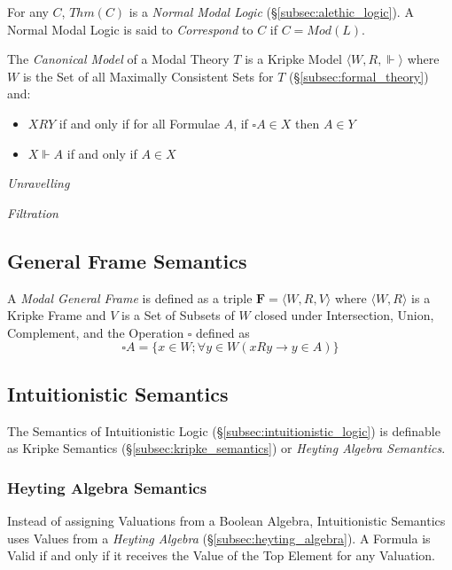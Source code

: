 For any $C$, $Thm(C)$ is a \emph{Normal Modal Logic}
(\S\ref{subsec:alethic_logic}). A Normal Modal Logic is said to
\emph{Correspond} to $C$ if $C = Mod(L)$.

The \emph{Canonical Model} of a Modal Theory $T$ is a Kripke Model
$\langle W,R, \Vdash \rangle$ where $W$ is the Set of all Maximally
Consistent Sets for $T$ (\S\ref{subsec:formal_theory}) and:
\begin{itemize}
\item $XRY$ if and only if for all Formulae $A$, if $\square A
  \in X$ then $A \in Y$
\item $X\Vdash A$ if and only if $A \in X$
\end{itemize}


\emph{Unravelling}

\emph{Filtration}

\subsection{General Frame Semantics}

A \emph{Modal General Frame} is defined as a triple $\mathbf{F} =
\langle W,R,V \rangle$ where $\langle W,R \rangle$ is a Kripke Frame
and $V$ is a Set of Subsets of $W$ closed under Intersection, Union,
Complement, and the Operation $\square$ defined as
\[
    \square A = \{x \in W; \forall y \in W ( x R y \rightarrow y \in A ) \}
\]

\subsection{Intuitionistic Semantics}

The Semantics of Intuitionistic Logic
(\S\ref{subsec:intuitionistic_logic}) is definable as Kripke Semantics
(\S\ref{subsec:kripke_semantics}) or \emph{Heyting Algebra Semantics}.

\subsubsection{Heyting Algebra Semantics}\label{subsec:heyting_semantics}

Instead of assigning Valuations from a Boolean Algebra, Intuitionistic
Semantics uses Values from a \emph{Heyting Algebra}
(\S\ref{subsec:heyting_algebra}). A Formula is Valid if and only if it
receives the Value of the Top Element for any Valuation.

